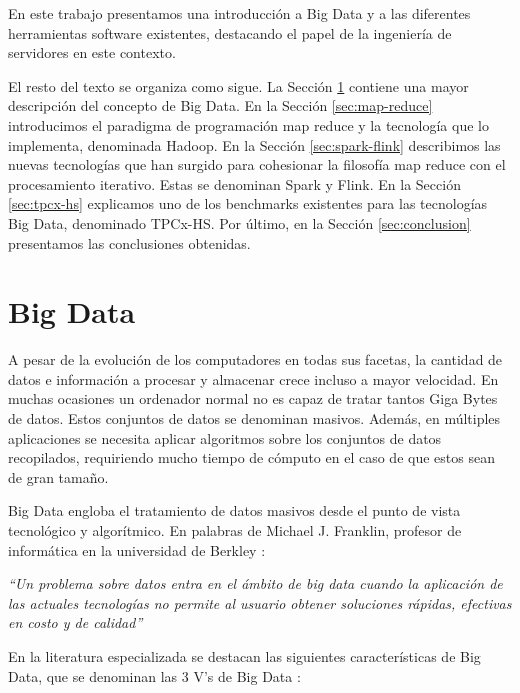 \documentclass{article}
\begin{document}
	En este trabajo presentamos una introducción a Big Data y a las diferentes herramientas software existentes, destacando el papel de la ingeniería de servidores en este contexto.

	El resto del texto se organiza como sigue. La Sección \ref{sec:big-data} contiene una mayor descripción del concepto de Big Data. En la Sección \ref{sec:map-reduce} introducimos el paradigma de programación map reduce y la tecnología que lo implementa, denominada Hadoop. En la Sección \ref{sec:spark-flink} describimos las nuevas tecnologías que han surgido para cohesionar la filosofía map reduce con el procesamiento iterativo. Estas se denominan Spark y Flink. En la Sección \ref{sec:tpcx-hs} explicamos uno de los benchmarks existentes para las tecnologías Big Data, denominado TPCx-HS. Por último, en la Sección \ref{sec:conclusion} presentamos las conclusiones obtenidas.

\section{Big Data} \label{sec:big-data}
	
	A pesar de la evolución de los computadores en todas sus facetas, la cantidad de datos e información a procesar y almacenar crece incluso a mayor velocidad. En muchas ocasiones un ordenador normal no es capaz de tratar tantos Giga Bytes de datos. Estos conjuntos de datos se denominan masivos. Además, en múltiples aplicaciones se necesita aplicar algoritmos sobre los conjuntos de datos recopilados, requiriendo mucho tiempo de cómputo en el caso de que estos sean de gran tamaño. 
	
	Big Data engloba el tratamiento de datos masivos desde el punto de vista tecnológico y algorítmico. En palabras de Michael J. Franklin, profesor de informática en la universidad de Berkley \cite{bd-definition}:
	
	\textit{``Un problema sobre datos entra en el ámbito de big data cuando la aplicación de las actuales tecnologías no permite al usuario obtener soluciones  rápidas, efectivas en costo y de calidad''}

	En la literatura especializada se destacan las siguientes características de Big Data, que se denominan las 3 V's de Big Data \cite{big-data}:
\end{document}
